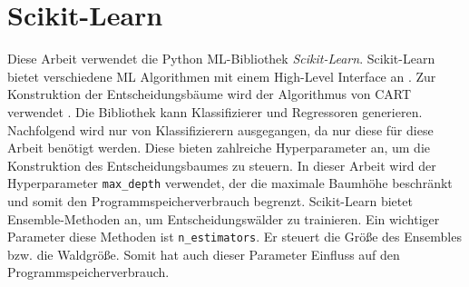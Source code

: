 \section{Scikit-Learn}
\label{sec:dt_scikit_learn}
Diese Arbeit verwendet die Python ML-Bibliothek \textit{Scikit-Learn}. Scikit-Learn bietet verschiedene ML Algorithmen mit einem High-Level Interface an \cite{scikit-learn}.
Zur Konstruktion der Entscheidungsbäume wird der Algorithmus von CART verwendet \cite{ScikitLearnCART}.
Die Bibliothek kann Klassifizierer und Regressoren generieren.
\newline
\newline
Nachfolgend wird nur von Klassifizierern ausgegangen, da nur diese für diese Arbeit benötigt werden. Diese bieten zahlreiche Hyperparameter an, um die Konstruktion des
Entscheidungsbaumes zu steuern. In dieser Arbeit wird der Hyperparameter \texttt{max\_depth} verwendet, der die maximale Baumhöhe beschränkt und somit
den Programmspeicherverbrauch begrenzt.
\newline
\newline
Scikit-Learn bietet Ensemble-Methoden an, um Entscheidungswälder zu trainieren. Ein wichtiger Parameter diese Methoden ist \texttt{n\_estimators}. Er steuert die Größe des Ensembles bzw.
die Waldgröße. Somit hat auch dieser Parameter Einfluss auf den Programmspeicherverbrauch.
